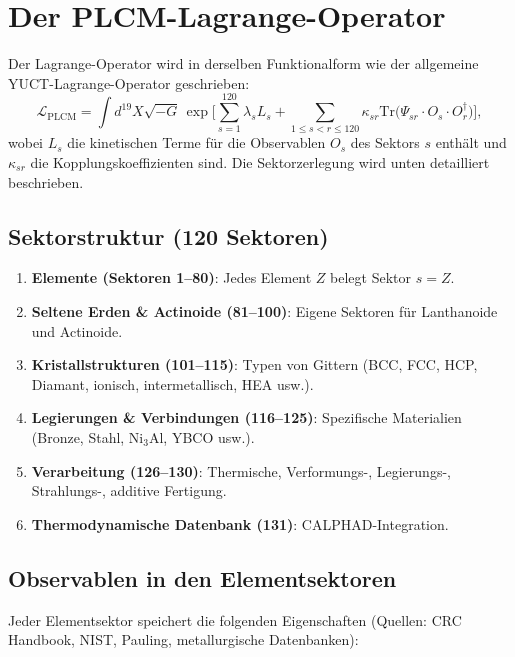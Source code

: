 \documentclass[12pt,a4paper]{article}
\begin{document}
	\section{Der PLCM-Lagrange-Operator}
	
	Der Lagrange-Operator wird in derselben Funktionalform wie der allgemeine YUCT-Lagrange-Operator geschrieben:
	\[
	\mathcal{L}_{\text{PLCM}} = \int d^{19}X \sqrt{-G} \,
	\exp\Bigg[ \sum_{s=1}^{120} \lambda_s L_s + \sum_{1\le s<r\le 120} \kappa_{sr} \mathrm{Tr}\big(\Psi_{sr} \cdot O_s \cdot O_r^\dagger\big) \Bigg],
	\]
	wobei \(L_s\) die kinetischen Terme für die Observablen \(O_s\) des Sektors \(s\) enthält und \(\kappa_{sr}\) die Kopplungskoeffizienten sind. Die Sektorzerlegung wird unten detailliert beschrieben.
	
	\subsection{Sektorstruktur (120 Sektoren)}
	
	\begin{enumerate}
		\item \textbf{Elemente (Sektoren 1–80)}: Jedes Element \(Z\) belegt Sektor \(s=Z\).
		\item \textbf{Seltene Erden \& Actinoide (81–100)}: Eigene Sektoren für Lanthanoide und Actinoide.
		\item \textbf{Kristallstrukturen (101–115)}: Typen von Gittern (BCC, FCC, HCP, Diamant, ionisch, intermetallisch, HEA usw.).
		\item \textbf{Legierungen \& Verbindungen (116–125)}: Spezifische Materialien (Bronze, Stahl, Ni\(_{3}\)Al, YBCO usw.).
		\item \textbf{Verarbeitung (126–130)}: Thermische, Verformungs-, Legierungs-, Strahlungs-, additive Fertigung.
		\item \textbf{Thermodynamische Datenbank (131)}: CALPHAD-Integration.
	\end{enumerate}
	
	\subsection{Observablen in den Elementsektoren}
	
	Jeder Elementsektor speichert die folgenden Eigenschaften (Quellen: CRC Handbook, NIST, Pauling, metallurgische Datenbanken):
	
\end{document}
